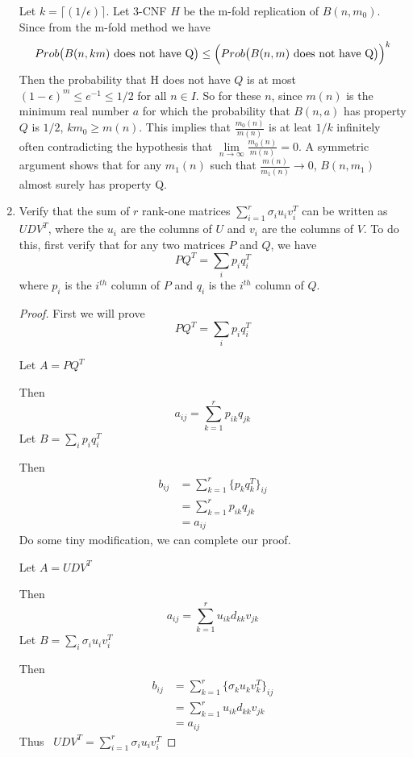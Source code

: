\documentclass[a4paper, 12pt]{mcshw}
\begin{document}
\begin{enumerate}
\begin{solution}
            Let $k = \lceil (1/\epsilon) \rceil$. Let 3-CNF $H$ be the m-fold replication of $B(n, m_0)$. Since from the m-fold method we have
            $$Prob\bigl(B(n, km)\text{ does not have Q}\bigr) \leq {\Bigl(Prob\bigl(B(n, m)\text{ does not have Q}\bigr)\Bigr)}^k$$
            Then the probability that H does not have $Q$ is at most ${(1 - \epsilon)}^m \leq e^{-1} \leq 1/2$ for all $n \in I$. So for these $n$, since $m(n)$ is the minimum real number $a$ for which the probability that $B(n, a)$ has property $Q$ is $1/2$, $km_0 \geq m(n)$. This implies that $\frac{m_0(n)}{m(n)}$ is at leat $1/k$ infinitely often contradicting the hypothesis that $\lim\limits_{n\to\infty}\frac{m_0(n)}{m(n)} = 0$. A symmetric argument shows that for any $m_1(n)$ such that $\frac{m(n)}{m_1(n)}\to 0$, $B(n,m_1)$ almost surely has property Q.
        \end{solution}
    \item Verify that the sum of $r$ rank-one matrices $\sum_{i = 1}^r\sigma_iu_iv_i^T$ can be written as $UDV^T$, where the $u_i$ are the columns of $U$ and $v_i$ are the columns of $V$. To do this, first verify that for any two matrices $P$ and $Q$, we have
        $$PQ^T = \sum_ip_iq_i^T$$
        where $p_i$ is the $i^{th}$ column of $P$ and $q_i$ is the $i^{th}$ column of $Q$.
        \begin{proof}
            First we will prove
            $$PQ^T = \sum_ip_iq_i^T$$

            Let $A = PQ^T$

            Then 
            $$a_{ij} = \sum_{k = 1}^rp_{ik}q_{jk}$$
            Let $B = \sum\limits_ip_iq_i^T$

            Then 
            \begin{align*}
                b_{ij} &= \sum_{k = 1}^r\{p_kq^T_k\}_{ij}\\
                &= \sum_{k = 1}^rp_{ik}q_{jk}\\
                &= a_{ij}
            \end{align*}
            Do some tiny modification, we can complete our proof.

            Let $A = UDV^T$

            Then 
            $$a_{ij} = \sum_{k = 1}^ru_{ik}d_{kk}v_{jk}$$
            Let $B = \sum\limits_i\sigma_iu_iv_i^T$

            Then 
            \begin{align*}
                b_{ij} &= \sum_{k = 1}^r\{\sigma_ku_kv_k^T\}_{ij}\\
                &= \sum_{k = 1}^ru_{ik}d_{kk}v_{jk}\\
                &= a_{ij}
            \end{align*}
            Thus \ $UDV^T = \sum\limits_{i = 1}^r\sigma_iu_iv_i^T$
        \end{proof}
\end{enumerate}
\end{document}

